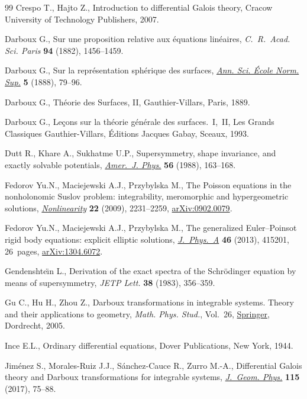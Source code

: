 \documentclass[pdftex]{sigma}%
\numberwithin{equation}{section}
\begin{document}
\begin{thebibliography}{99}
Crespo T., Hajto Z., Introduction to differential {G}alois theory, Cracow
 University of Technology Publishers, 2007.

Darboux G., Sur une proposition relative aux \'equations lin\'eaires,
 \textit{C.~R.~Acad. Sci. Paris} \textbf{94} (1882), 1456--1459.

Darboux G., Sur la repr\'esentation sph\'erique des surfaces, \href{https://doi.org/10.24033/asens.307}{\textit{Ann. Sci.
 \'Ecole Norm. Sup.}} \textbf{5} (1888), 79--96.

Darboux G., Th\'eorie des Surfaces, II, Gauthier-Villars, Paris, 1889.

Darboux G., Le\c{c}ons sur la th\'eorie g\'en\'erale des surfaces.~{I},~{II},
 Les Grands Classiques Gauthier-Villars, \'Editions Jacques Gabay, Sceaux,
 1993.

Dutt R., Khare A., Sukhatme U.P., Supersymmetry, shape invariance, and exactly
 solvable potentials, \href{https://doi.org/10.1119/1.15697}{\textit{Amer.~J. Phys.}} \textbf{56} (1988), 163--168.

Fedorov Yu.N., Maciejewski A.J., Przybylska M., The {P}oisson equations in the
 nonholonomic {S}uslov problem: integrability, meromorphic and hypergeometric
 solutions, \href{https://doi.org/10.1088/0951-7715/22/9/009}{\textit{Nonlinearity}} \textbf{22} (2009), 2231--2259,
 \href{https://arxiv.org/abs/0902.0079}{arXiv:0902.0079}.

Fedorov Yu.N., Maciejewski A.J., Przybylska M., The generalized
 {E}uler--{P}oinsot rigid body equations: explicit elliptic solutions,
 \href{https://doi.org/10.1088/1751-8113/46/41/415201}{\textit{J.~Phys.~A}} \textbf{46} (2013), 415201, 26~pages, \href{https://arxiv.org/abs/1304.6072}{arXiv:1304.6072}.

Gendenshte\"{\i}n L., Derivation of the exact spectra of the {S}chr\"odinger
 equation by means of supersymmetry, \textit{JETP Lett.} \textbf{38} (1983),
 356--359.

Gu C., Hu H., Zhou Z., Darboux transformations in integrable systems. Theory
 and their applications to geometry, \textit{Math. Phys. Stud.}, Vol.~26,
 \href{https://doi.org/10.1007/1-4020-3088-6}{Springer}, Dordrecht, 2005.

Ince E.L., Ordinary differential equations, Dover Publications, New York, 1944.

Jim\'enez S., Morales-Ruiz J.J., S\'anchez-Cauce R., Zurro M.-A., Differential
 {G}alois theory and {D}arboux transformations for integrable systems,
 \href{https://doi.org/10.1016/j.geomphys.2016.06.016}{\textit{J.~Geom. Phys.}} \textbf{115} (2017), 75--88.


\end{thebibliography}
\end{document}
